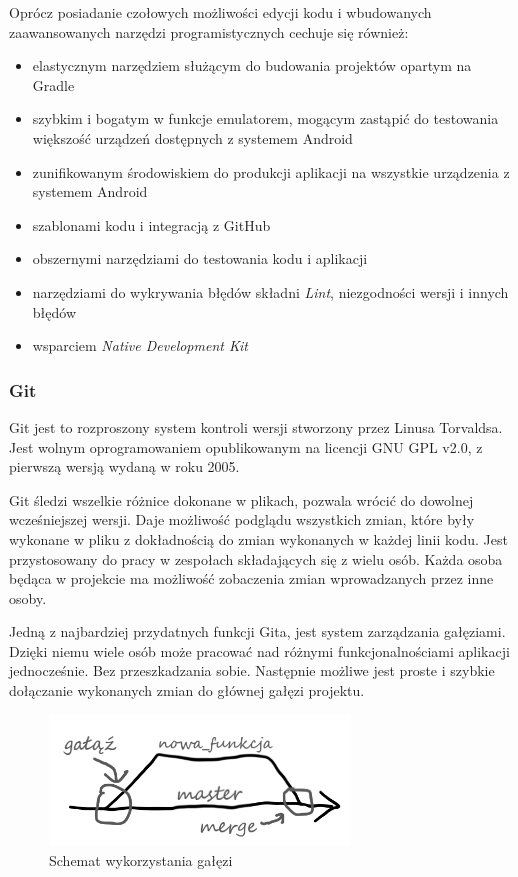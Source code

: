\documentclass[a4paper,12pt, twoside]{article}
\begin{document}
    	\begin{flushleft}
    	Oprócz posiadanie czołowych możliwości edycji kodu i wbudowanych zaawansowanych narzędzi programistycznych cechuje się również:
    	\begin{itemize}
    	    \item elastycznym narzędziem służącym do budowania projektów opartym na Gradle\cite{gradle}
    	    \item szybkim i bogatym w funkcje emulatorem, mogącym zastąpić do testowania większość urządzeń dostępnych z systemem Android
    	    \item zunifikowanym środowiskiem do produkcji aplikacji na wszystkie urządzenia z systemem Android
    	    \item szablonami kodu i integracją z GitHub
    	    \item obszernymi narzędziami do testowania kodu i aplikacji
    	    \item narzędziami do wykrywania błędów składni \textit{Lint}\cite{lint}, niezgodności wersji i innych błędów
    	    \item wsparciem \textit{Native Development Kit}\cite{ndk}
    	\end{itemize}
    	\end{flushleft}
    	
    	\subsubsection{Git}
    	Git jest to rozproszony system kontroli wersji stworzony przez Linusa Torvaldsa. Jest wolnym oprogramowaniem opublikowanym na licencji GNU GPL v2.0, z pierwszą wersją wydaną w roku 2005.
    	
    	Git śledzi wszelkie różnice dokonane w plikach, pozwala wrócić do dowolnej wcześniejszej wersji. Daje możliwość podglądu wszystkich zmian, które były wykonane w pliku z dokładnością do zmian wykonanych w każdej linii kodu. Jest przystosowany do pracy w zespołach składających się z wielu osób. Każda osoba będąca w projekcie ma możliwość zobaczenia zmian wprowadzanych przez inne osoby.
    	
    	Jedną z najbardziej przydatnych funkcji Gita, jest system zarządzania gałęziami. Dzięki niemu wiele osób może pracować nad różnymi funkcjonalnościami aplikacji jednocześnie. Bez przeszkadzania sobie. Następnie możliwe jest proste i szybkie dołączanie wykonanych zmian do głównej gałęzi projektu.
    	
    		\begin{figure}[H]
    			\centering
    			\includegraphics[width=8cm]{images/rys1_branches.png}
    			\caption{Schemat wykorzystania gałęzi}
                \label{fig:branching}
    		\end{figure}
    
\end{document}
